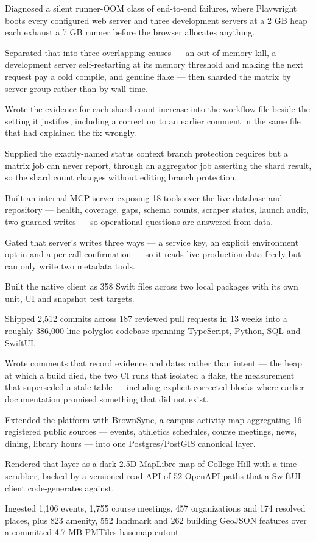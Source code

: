 \documentclass[letterpaper,11pt]{article}
\newcommand{\resumeItem}[1]{
  \item\small{
    {#1 \vspace{-2pt}}
  }
}
\begin{document}
            \resumeItem{Diagnosed a silent runner-OOM class of end-to-end failures, where Playwright boots every configured web server and three development servers at a 2 GB heap each exhaust a 7 GB runner before the browser allocates anything.}
            \resumeItem{Separated that into three overlapping causes --- an out-of-memory kill, a development server self-restarting at its memory threshold and making the next request pay a cold compile, and genuine flake --- then sharded the matrix by server group rather than by wall time.}
            \resumeItem{Wrote the evidence for each shard-count increase into the workflow file beside the setting it justifies, including a correction to an earlier comment in the same file that had explained the fix wrongly.}
            \resumeItem{Supplied the exactly-named status context branch protection requires but a matrix job can never report, through an aggregator job asserting the shard result, so the shard count changes without editing branch protection.}
            \resumeItem{Built an internal MCP server exposing 18 tools over the live database and repository --- health, coverage, gaps, schema counts, scraper status, launch audit, two guarded writes --- so operational questions are answered from data.}
            \resumeItem{Gated that server's writes three ways --- a service key, an explicit environment opt-in and a per-call confirmation --- so it reads live production data freely but can only write two metadata tools.}
            \resumeItem{Built the native client as 358 Swift files across two local packages with its own unit, UI and snapshot test targets.}
            \resumeItem{Shipped 2,512 commits across 187 reviewed pull requests in 13 weeks into a roughly 386,000-line polyglot codebase spanning TypeScript, Python, SQL and SwiftUI.}
            \resumeItem{Wrote comments that record evidence and dates rather than intent --- the heap at which a build died, the two CI runs that isolated a flake, the measurement that superseded a stale table --- including explicit corrected blocks where earlier documentation promised something that did not exist.}
            \resumeItem{Extended the platform with BrownSync, a campus-activity map aggregating 16 registered public sources --- events, athletics schedules, course meetings, news, dining, library hours --- into one Postgres/PostGIS canonical layer.}
            \resumeItem{Rendered that layer as a dark 2.5D MapLibre map of College Hill with a time scrubber, backed by a versioned read API of 52 OpenAPI paths that a SwiftUI client code-generates against.}
            \resumeItem{Ingested 1,106 events, 1,755 course meetings, 457 organizations and 174 resolved places, plus 823 amenity, 552 landmark and 262 building GeoJSON features over a committed 4.7 MB PMTiles basemap cutout.}
\end{document}
